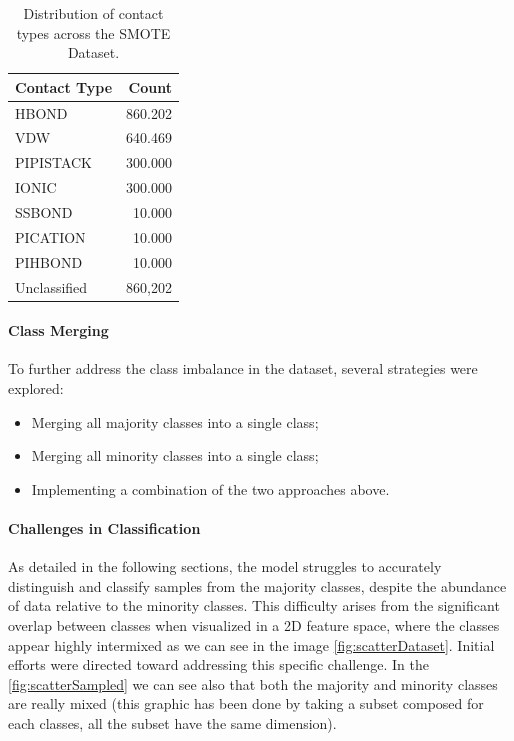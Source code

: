 \documentclass[10pt,twocolumn,letterpaper]{article}
\begin{document}
\begin{table}[h!]
    \centering
    \begin{tabular}{|l|r|}
    \hline
    \textbf{Contact Type} & \textbf{Count} \\
    \hline
    HBOND & 860.202 \\
    VDW & 640.469 \\
    PIPISTACK & 300.000 \\
    IONIC & 300.000 \\
    SSBOND & 10.000 \\
    PICATION & 10.000 \\
    PIHBOND & 10.000 \\
    Unclassified & 860,202 \\
    \hline
    \end{tabular}
    \caption{Distribution of contact types across the SMOTE Dataset.}
    \label{tab:smoteDataset}
\end{table}

\paragraph{Class Merging}
To further address the class imbalance in the dataset, several strategies were explored:
\begin{itemize}
    \item Merging all majority classes into a single class;
    \item Merging all minority classes into a single class;
    \item Implementing a combination of the two approaches above.
\end{itemize}

\paragraph{Challenges in Classification}
As detailed in the following sections, the model struggles to accurately distinguish and classify samples from 
the majority classes, despite the abundance of data relative to the minority classes. This difficulty arises 
from the significant overlap between classes when visualized in a 2D feature space, where the classes appear 
highly intermixed as we can see in the image \ref{fig:scatterDataset}. Initial efforts were directed toward addressing this specific challenge. In the \ref{fig:scatterSampled} we can see also that both the
majority and minority classes are really mixed (this graphic has been done by taking a subset composed for each classes, all the subset have the same dimension). 
\end{document}
